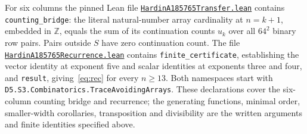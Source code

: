 \documentclass[11pt]{article}
\begin{document}
For six columns the pinned Lean file
\href{https://github.com/the-omega-institute/trureturing/blob/66c49bfe9a1295ceea872b6e6a1d8146fb351237/D5/S3/Combinatorics/TraceAvoidingArrays/HardinA185765Transfer.lean}{\texttt{HardinA185765Transfer.lean}}
contains \texttt{counting\_bridge}: the literal natural-number array
cardinality at $n=k+1$, embedded in $\mathbb Z$, equals the sum of its
continuation counts $u_k$ over all $64^2$ binary row pairs. Pairs outside
$S$ have zero continuation count. The file
\href{https://github.com/the-omega-institute/trureturing/blob/66c49bfe9a1295ceea872b6e6a1d8146fb351237/D5/S3/Combinatorics/TraceAvoidingArrays/HardinA185765Recurrence.lean}{\texttt{HardinA185765Recurrence.lean}}
contains \texttt{finite\_certificate}, establishing the vector identity
at exponent five and scalar identities at exponents three and four,
and \texttt{result}, giving~\eqref{eq:rec} for every $n\geq13$.
Both namespaces start with
\texttt{D5.S3.Combinatorics.}\allowbreak\texttt{TraceAvoidingArrays}.
These declarations cover the six-column counting bridge and recurrence;
the generating functions, minimal order, smaller-width corollaries,
transposition and divisibility are the written arguments and finite
identities specified above.
\end{document}
